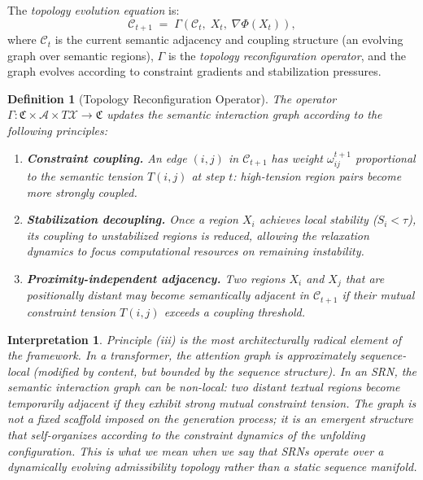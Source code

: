 \documentclass[11pt, a4paper]{article}
\theoremstyle{srn}
\newtheorem{definition}{Definition}[section]
\theoremstyle{srnremark}
\newtheorem{interpretation}{Interpretation}[section]
\newcommand{\Aspace}{\mathcal{A}}           %
\newcommand{\Cstruct}{\mathcal{C}}           %
\newcommand{\Gop}{\Gamma}              %
\newcommand{\Phiten}{\varPhi}            %
\begin{document}
The \emph{topology evolution equation} is:
\begin{equation}
  \label{eq:topology}
  \Cstruct_{t+1}
  \;=\;
  \Gop\!\left(\Cstruct_t,\; X_t,\; \nabla\Phiten(X_t)\right),
\end{equation}
where $\Cstruct_t$ is the current semantic adjacency and coupling structure
(an evolving graph over semantic regions), $\Gop$ is the
\emph{topology reconfiguration operator}, and the graph evolves
according to constraint gradients and stabilization pressures.

\begin{definition}[Topology Reconfiguration Operator]
\label{def:topology}
The operator $\Gop : \mathfrak{C} \times \Aspace \times T\mathcal{X} \to
\mathfrak{C}$ updates the semantic interaction graph according to the
following principles:
\begin{enumerate}
  \item[(i)] \textbf{Constraint coupling.}
    An edge $(i,j)$ in $\Cstruct_{t+1}$ has weight $\omega_{ij}^{t+1}$
    proportional to the semantic tension $T(i,j)$ at step $t$:
    high-tension region pairs become more strongly coupled.
  \item[(ii)] \textbf{Stabilization decoupling.}
    Once a region $X_i$ achieves local stability ($S_i < \tau$),
    its coupling to unstabilized regions is reduced, allowing
    the relaxation dynamics to focus computational resources on
    remaining instability.
  \item[(iii)] \textbf{Proximity-independent adjacency.}
    Two regions $X_i$ and $X_j$ that are positionally distant may
    become \emph{semantically adjacent} in $\Cstruct_{t+1}$ if their
    mutual constraint tension $T(i,j)$ exceeds a coupling threshold.
\end{enumerate}
\end{definition}

\begin{interpretation}
Principle (iii) is the most architecturally radical element of the
framework.
In a transformer, the attention graph is approximately sequence-local
(modified by content, but bounded by the sequence structure).
In an SRN, the semantic interaction graph can be non-local: two
distant textual regions become temporarily adjacent if they exhibit
strong mutual constraint tension.
The graph is not a fixed scaffold imposed on the generation process; it
is an emergent structure that self-organizes according to the
constraint dynamics of the unfolding configuration.
This is what we mean when we say that SRNs operate over a dynamically
evolving admissibility topology rather than a static sequence manifold.
\end{interpretation}
\end{document}
